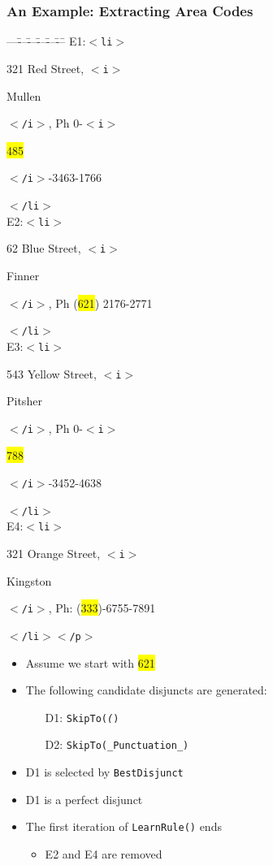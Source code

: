 \documentclass[svgnames]{beamer}
\newcounter{curtagcolor}
\newcommand{\xbtag}[1]{\textcolor{tagcolor!![\thecurtagcolor]}{$<$\texttt{#1}$>$}}
\newcommand{\xetag}[1]{\textcolor{tagcolor!![\thecurtagcolor]}{$<$\texttt{/#1}$>$}}
\newcommand{\xctag}[2]{\xbtag{#1}\addtocounter{curtagcolor}{1}#2\addtocounter{curtagcolor}{-1}\xetag{#1}}
\newenvironment{xml}{
  \begin{minipage}{.6\textwidth}
    \begin{tabbing}
      ---\=---\=---\=---\=---\=---\=\kill}{   
    \end{tabbing}
  \end{minipage}
}
\begin{document}
\begin{frame} \frametitle{An Example: Extracting Area Codes}
  
  \begin{exampleblock}{}
    \centering \scriptsize
    \begin{xml}
      E1:\xctag{li}{321 Red Street, \xctag{i}{Mullen}, Ph
        0-\xctag{i}{\colorbox{yellow}{485}}-3463-1766} \\
      E2:\xctag{li}{62 Blue Street, \xctag{i}{Finner}, Ph
        (\colorbox{yellow}{621}) 2176-2771} \\
      E3:\xctag{li}{543 Yellow Street, \xctag{i}{Pitsher}, Ph
        0-\xctag{i}{\colorbox{yellow}{788}}-3452-4638} \\
      E4:\xctag{li}{321 Orange Street, \xctag{i}{Kingston}, Ph:
        (\colorbox{yellow}{333})-6755-7891}\xetag{p}
    \end{xml}
  \end{exampleblock}

  \begin{itemize}
  \item Assume we start with \colorbox{yellow}{621}
  \item The following candidate disjuncts are generated: 
    \begin{itemize}
    \item[D1:] \texttt{SkipTo(\textit{(}) }
    \item[D2:] \texttt{SkipTo(\_Punctuation\_)}
    \end{itemize}
  \item D1 is selected by \texttt{BestDisjunct}
  \item D1 is a perfect disjunct
  \item The first iteration of \texttt{LearnRule()} ends
    \begin{itemize}
    \item E2 and E4 are removed
    \end{itemize}
  \end{itemize}

\end{frame}

\end{document}
